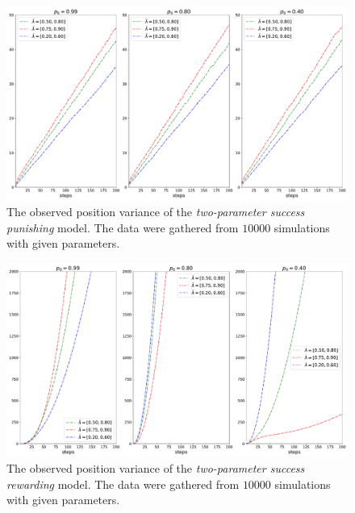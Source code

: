 \documentclass[runningheads]{CMSIM}
\begin{document}
\begin{definition}
        \begin{figure}
            \includegraphics[width=1\textwidth]{../simulations/e_position_10000_walks_200_steps_type_success_punished_two_lambdas}
            \caption{\label{fig:var_s_t_2l_sp}The observed position variance of the \emph{two-parameter
            success punishing} model.
            The data were gathered from $10000$ simulations
            with given parameters.}

        \end{figure}

        \begin{figure}
            \includegraphics[width=1\textwidth]{../simulations/e_position_10000_walks_200_steps_type_success_rewarded_two_lambdas}

            \caption{\label{fig:var_s_t_2l_sr}The observed position variance of the \emph{two-parameter
            success rewarding} model.
            The data were gathered from $10000$ simulations
            with given parameters.}

        \end{figure}
    \end{definition}
\end{document}
